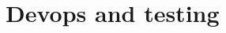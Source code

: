 \documentclass[../main.tex]{subfiles}
\begin{document}
\chapter{Devops and testing}



\end{document}
